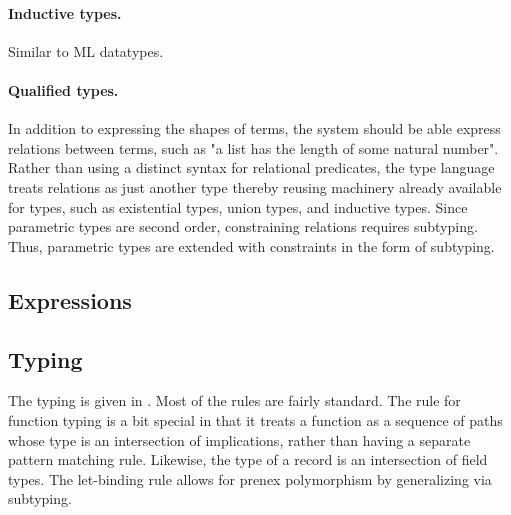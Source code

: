 \documentclass[sigplan,screen,review]{acmart}
\begin{document}
\paragraph{Inductive types.} Similar to ML datatypes.

\paragraph{Qualified types.}
In addition to expressing the shapes of terms, the system should be able express relations between terms,
such as "a list has the length of some natural number".
Rather than using a distinct syntax for relational predicates, 
the type language treats relations as just another type thereby reusing machinery already 
available for types, such as existential types, union types, and inductive types.
Since parametric types are second order, constraining relations requires subtyping.
Thus, parametric types are extended with constraints in the form of subtyping.


\subsection{Expressions}

\subsection{Typing}
The typing is given in .
Most of the rules are fairly standard. 
The rule for function typing is a bit special in that
it treats a function as a sequence of paths whose type is an intersection of implications,
rather than having a separate pattern matching rule. 
Likewise, the type of a record is an intersection of field types.
The let-binding rule allows for prenex polymorphism by generalizing via subtyping. 
\end{document}
